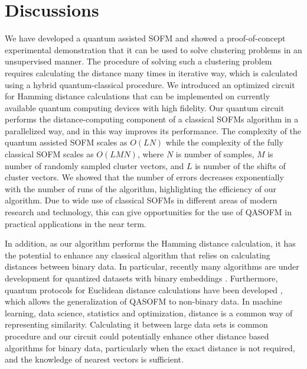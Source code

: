 \documentclass[pra,showkeys,twocolumn,showpacs,aps,10pt]{revtex4-2}
\begin{document}
\section{Discussions}
We have developed a quantum assisted SOFM and showed a proof-of-concept experimental demonstration
that it can be used to solve clustering problems in an unsupervised manner.
The procedure of solving such a clustering problem requires calculating the distance many times in iterative way,
which is calculated using a hybrid quantum-classical procedure.
We introduced an optimized circuit for Hamming distance calculations that can be implemented on currently available quantum computing devices with high fidelity.
Our quantum circuit performs the distance-computing component of a classical SOFMs algorithm in a parallelized way,
and in this way improves its performance.
The complexity of the quantum assisted SOFM scales as $O(LN)$
while the complexity of the fully classical SOFM scales as $O(LMN)$,
where $N$ is number of samples, $M$ is number of randomly sampled cluster vectors,
and $L$ is number of the shifts of cluster vectors.  We showed that the number of errors decreases exponentially with the number of runs of the algorithm, highlighting the efficiency of our algorithm. Due to wide use of classical SOFMs in different areas of modern research and technology,
this can give opportunities for the use of QASOFM in practical applications in the near term.

In addition, as our algorithm performs the Hamming distance calculation,
it has the potential to enhance any classical algorithm that relies on calculating distances between binary data. In particular, recently many algorithms are under development for quantized datasets with binary embeddings \cite{zhuangFastTrainingTripletBased2016,yiBinaryEmbeddingFundamental2015,AsymmetricDistancesBinary}. Furthermore, quantum protocols for Euclidean distance calculations have been developed \cite{yuQuantumAlgorithmsSimilarity2020,zardiniQuantumKnearestNeighbors2024}, which allows the generalization of QASOFM to non-binary data. In machine learning, data science, statistics and optimization, distance is a common way of representing similarity.  Calculating it between large data sets is common procedure
and our circuit could potentially enhance other distance based algorithms for binary data, particularly when the exact distance is not required,
and the knowledge of nearest vectors is sufficient.
\end{document}
